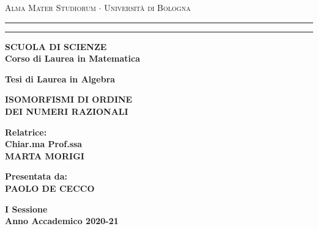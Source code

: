 \begin{titlepage}
\begin{center}
{{\Large{\textsc{Alma Mater Studiorum $\cdot$ Universit\`a di
Bologna}}}} \rule[0.1cm]{15.8cm}{0.1mm}
\rule[0.5cm]{15.8cm}{0.6mm}
{\small{\bf SCUOLA DI SCIENZE\\
Corso di Laurea in Matematica }}
\end{center}
\vspace{10mm}
\begin{center}
    {\Large{\bf Tesi di Laurea in Algebra}}\\
\end{center}
\vspace{5mm}
\begin{center}
{\LARGE{\bf ISOMORFISMI DI ORDINE}}\\
\vspace{3mm}
{\LARGE{\bf DEI NUMERI RAZIONALI}}\\
\end{center}
\vspace{70mm}
\par
\noindent
\begin{minipage}[t]{0.47\textwidth}
{\large{\bf Relatrice:\\
Chiar.ma Prof.ssa\\
MARTA MORIGI}}
\end{minipage}
\hfill
\begin{minipage}[t]{0.47\textwidth}\raggedleft
{\large{\bf Presentata da:\\
PAOLO DE CECCO}}
\end{minipage}
\vspace{30mm}
\begin{center}
{\large{\bf I Sessione\\%
Anno Accademico 2020-21}}%
\end{center}
\end{titlepage}